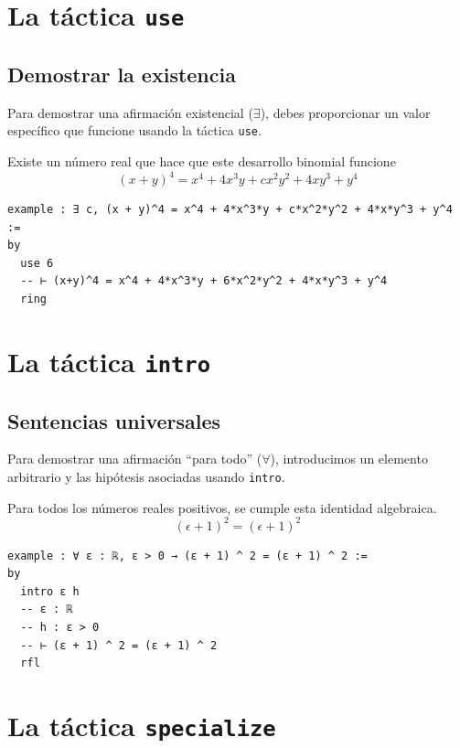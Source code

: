 \section{La táctica \texttt{use}}

\subsection*{Demostrar la existencia}

Para demostrar una afirmación existencial ($\exists$), debes proporcionar un
valor específico que funcione usando la táctica \texttt{use}.

\begin{theorem}
  Existe un número real que hace que este desarrollo binomial funcione
  \[ (x + y)^4 = x^4 + 4x^3y + cx^2y^2 + 4xy^3 + y^4 \]
\end{theorem}

\begin{verbatim}
example : ∃ c, (x + y)^4 = x^4 + 4*x^3*y + c*x^2*y^2 + 4*x*y^3 + y^4 :=
by
  use 6
  -- ⊢ (x+y)^4 = x^4 + 4*x^3*y + 6*x^2*y^2 + 4*x*y^3 + y^4
  ring
\end{verbatim}

\section{La táctica \texttt{intro}}

\subsection*{Sentencias universales}

Para demostrar una afirmación ``para todo'' ($\forall$), introducimos un
elemento arbitrario y las hipótesis asociadas usando \texttt{intro}.

\begin{theorem}
Para todos los números reales positivos, se cumple esta identidad
algebraica.
\[(\epsilon + 1)^2 = (\epsilon + 1)^2 \]
\end{theorem}

\begin{verbatim}
example : ∀ ε : ℝ, ε > 0 → (ε + 1) ^ 2 = (ε + 1) ^ 2 :=
by
  intro ε h
  -- ε : ℝ
  -- h : ε > 0
  -- ⊢ (ε + 1) ^ 2 = (ε + 1) ^ 2
  rfl
\end{verbatim}

\section{La táctica \texttt{specialize}}

